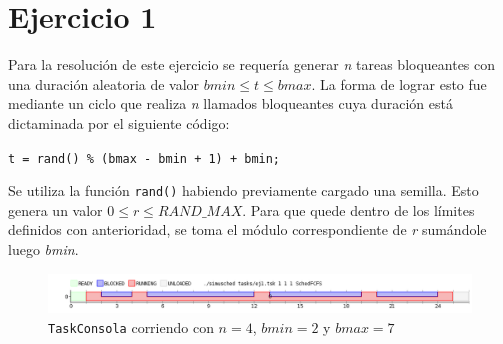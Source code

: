 \section{Ejercicio 1}

Para la resolución de este ejercicio se requería generar \emph{n} tareas
bloqueantes con una duración aleatoria de valor $bmin \leq t \leq bmax$. La forma de
lograr esto fue mediante un ciclo que realiza \emph{n} llamados bloqueantes cuya
duración está dictaminada por el siguiente código:

\begin{center}
	\texttt{t = rand() \% (bmax - bmin + 1) + bmin;}
\end{center}

Se utiliza la función \texttt{rand()} habiendo previamente cargado una semilla.
Esto genera un valor $0 \leq r \leq RAND\_MAX$. Para que quede dentro de los
límites definidos con anterioridad, se toma el módulo correspondiente de
\emph{r} sumándole luego \emph{bmin}.

\begin{figure}[ht]
	\begin{center}
		\includegraphics[width=1\columnwidth]{imagenes/ej1.png}
		\caption{\texttt{TaskConsola} corriendo con $n = 4$, $bmin = 2$ y $bmax
		= 7$}
	\end{center}
\end{figure}

